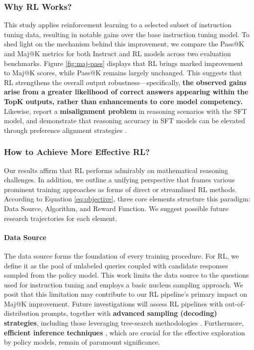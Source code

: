 \begin{itemize}[topsep=0pt]
\subsubsection{Why RL Works?} This study applies reinforcement learning to a selected subset of instruction tuning data, resulting in notable gains over the base instruction tuning model. To shed light on the mechanism behind this improvement, we compare the Pass@K and Maj@K metrics for both Instruct and RL models across two evaluation benchmarks. Figure \ref{fig:maj-pass} displays that RL brings marked improvement to Maj@K scores, while Pass@K remains largely unchanged. This suggests that RL strengthens the overall output robustness—specifically, \textbf{the observed gains arise from a greater likelihood of correct answers appearing within the TopK outputs, rather than enhancements to core model competency.} Likewise, \citep{wang2023making} report a \textbf{misalignment problem} in reasoning scenarios with the SFT model, and demonstrate that reasoning accuracy in SFT models can be elevated through preference alignment strategies \citep{yuan2023rrhf,song2023preference,wang2023making}.

\subsubsection{How to Achieve More Effective RL?}
\label{sec:effec_rl}
Our results affirm that RL performs admirably on mathematical reasoning challenges. In addition, we outline a unifying perspective that frames various prominent training approaches as forms of direct or streamlined RL methods. According to Equation \ref{eq:objective}, three core elements structure this paradigm: Data Source, Algorithm, and Reward Function. We suggest possible future research trajectories for each element.

\paragraph{Data Source} The data source forms the foundation of every training procedure. For RL, we define it as the pool of unlabeled queries coupled with candidate responses sampled from the policy model. This work limits the data source to the questions used for instruction tuning and employs a basic nucleus sampling approach. We posit that this limitation may contribute to our RL pipeline’s primary impact on Maj@K improvement. Future investigations will assess RL pipelines with out-of-distribution prompts, together with \textbf{advanced sampling (decoding) strategies}, including those leveraging tree-search methodologies \citep{yao2023tree}. Furthermore, \textbf{efficient inference techniques} \citep{xia-etal-2023-speculative,leviathan2023fast,kwon2023efficient,xia2024unlocking}, which are crucial for the effective exploration by policy models, remain of paramount significance.


\end{itemize}
